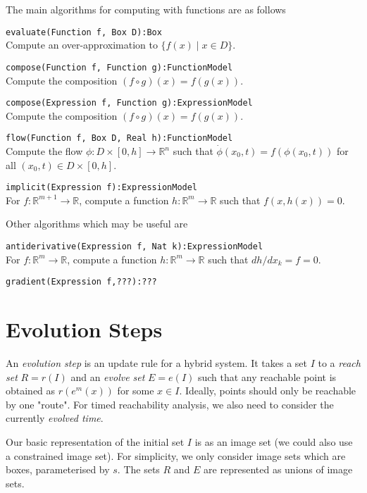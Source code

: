 \documentclass[english,a4paper]{article}
\newcommand{\R}{\mathbb{R}}
\theoremstyle{theorem}
\theoremstyle{definition}
\theoremstyle{remark}
\begin{document}
The main algorithms for computing with functions are as follows
\begin{description}
\item \texttt{evaluate(Function f, Box D):Box}\\ Compute an over-approximation to $\{ f(x) \mid x\in D\}$.
\item \texttt{compose(Function f, Function g):FunctionModel}\\ Compute the composition $(f\circ g)(x)=f(g(x))$.
\item \texttt{compose(Expression f, Function g):ExpressionModel}\\ Compute the composition $(f\circ g)(x)=f(g(x))$.
\item \texttt{flow(Function f, Box D, Real h):FunctionModel}\\ Compute the flow $\phi:D\times[0,h]\rightarrow \R^n$ such that $\dot{\phi}(x_0,t)=f(\phi(x_0,t))$ for all $(x_0,t)\in D\times[0,h]$.
\item \texttt{implicit(Expression f):ExpressionModel}\\ For $f:\R^{m+1}\rightarrow\R$, compute a function $h:\R^{m}\rightarrow\R$ such that $f(x,h(x))=0$.
\end{description}
Other algorithms which may be useful are
\begin{description}
\item \texttt{antiderivative(Expression f, Nat k):ExpressionModel}\\ For $f:\R^{m}\rightarrow\R$, compute a function $h:\R^{m}\rightarrow\R$ such that $dh/dx_k=f=0$.
\item \texttt{gradient(Expression f,???):???}
\end{description}

\section{Evolution Steps}

An \emph{evolution step} is an update rule for a hybrid system. It takes a set $I$ to a \emph{reach set} $R=r(I)$ and an \emph{evolve set} $E=e(I)$ such that any reachable point is obtained as $r(e^m(x))$ for some $x\in I$. Ideally, points should only be reachable by one "route". For timed reachability analysis, we also need to consider the currently \emph{evolved time}.

Our basic representation of the initial set $I$ is as an image set (we could also use a constrained image set). For simplicity, we only consider image sets which are boxes, parameterised by $s$. The sets $R$ and $E$ are represented as unions of image sets.
\end{document}
